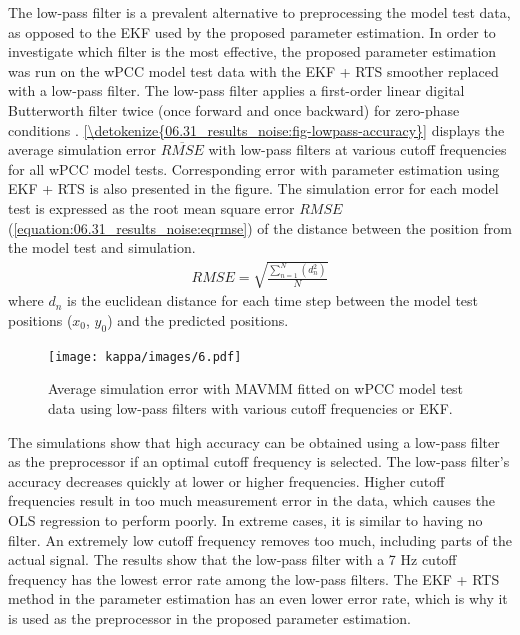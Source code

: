 The low-pass filter is a prevalent alternative to preprocessing the model test data, as opposed to the EKF used by the proposed parameter estimation.
In order to investigate which filter is the most effective, the proposed parameter estimation was run on the wPCC model test data with the EKF + RTS smoother replaced with a low-pass filter. The low-pass filter applies a first-order linear digital Butterworth filter twice (once forward and once backward) for zero-phase conditions \cite{virtanenSciPy10Fundamental2020}. \hyperref[\detokenize{06.31_results_noise:fig-lowpass-accuracy}]{\autoref{\detokenize{06.31_results_noise:fig-lowpass-accuracy}}} displays the average simulation error \( \overline{RMSE} \) with low-pass filters at various cutoff frequencies for all wPCC model tests. Corresponding error with parameter estimation using EKF + RTS is also presented in the figure. The simulation error for each model test is expressed as the root mean square error \(RMSE\) (\autoref{equation:06.31_results_noise:eqrmse}) of the distance between the position from the model test and simulation.
\begin{equation}\label{equation:06.31_results_noise:eqrmse}
\begin{split}RMSE=\sqrt{ \frac{\sum_{n=1}^{N} (d_n^2) }{N}} \end{split}
\end{equation}
where \(d_n\) is the euclidean distance for each time step between the model test positions (\(x_0\), \(y_0\)) and the predicted positions.
\begin{figure}[h!]
\centering
\texttt{[image: kappa/images/6.pdf]}
\caption{Average simulation error with MAVMM fitted on wPCC model test data using low-pass filters with various cutoff frequencies or EKF.}\label{\detokenize{06.31_results_noise:fig-lowpass-accuracy}}\end{figure} 
\noindent The simulations show that high accuracy can be obtained using a low-pass filter as the preprocessor if an optimal cutoff frequency is selected. The low-pass filter's accuracy decreases quickly at lower or higher frequencies. Higher cutoff frequencies result in too much measurement error in the data, which causes the OLS regression to perform poorly. In extreme cases, it is similar to having no filter. An extremely low cutoff frequency removes too much, including parts of the actual signal. The results show that the low-pass filter with a 7 Hz cutoff frequency has the lowest error rate among the low-pass filters. The EKF + RTS method in the parameter estimation has an even lower error rate, which is why it is used as the preprocessor in the proposed parameter estimation.
